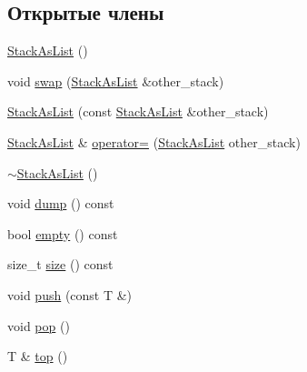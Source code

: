 \subsection*{Открытые члены}
\begin{DoxyCompactItemize}
\item 
\hyperlink{classstacks_1_1_stack_as_list_afeaf9531232f88bbfaea6fa27bfbfadb}{Stack\+As\+List} ()
\item 
void \hyperlink{classstacks_1_1_stack_as_list_ac60180f79b421783661b48e0aa3f5ed4}{swap} (\hyperlink{classstacks_1_1_stack_as_list}{Stack\+As\+List} \&other\+\_\+stack)
\item 
\hyperlink{classstacks_1_1_stack_as_list_a0506170dead8015e69e5216269f7d730}{Stack\+As\+List} (const \hyperlink{classstacks_1_1_stack_as_list}{Stack\+As\+List} \&other\+\_\+stack)
\item 
\hyperlink{classstacks_1_1_stack_as_list}{Stack\+As\+List} \& \hyperlink{classstacks_1_1_stack_as_list_ae7aad592f9620668c52ea8a68257bdd2}{operator=} (\hyperlink{classstacks_1_1_stack_as_list}{Stack\+As\+List} other\+\_\+stack)
\item 
\hyperlink{classstacks_1_1_stack_as_list_aa1bf1ce65b108c2888d95195bfc9d473}{$\sim$\+Stack\+As\+List} ()
\item 
void \hyperlink{classstacks_1_1_stack_as_list_aa1da18d566ab35554f4d3005d345ee5e}{dump} () const 
\item 
bool \hyperlink{classstacks_1_1_stack_as_list_a56147e51e4a0c2fef70e6d40a7a0b63d}{empty} () const 
\item 
size\+\_\+t \hyperlink{classstacks_1_1_stack_as_list_abd769ed3547312e16f9d8a1eff362cf0}{size} () const 
\item 
void \hyperlink{classstacks_1_1_stack_as_list_abb8422958e3e7605f040550ab4400ccb}{push} (const T \&)
\item 
void \hyperlink{classstacks_1_1_stack_as_list_a2f2b3319a9d76a9feb84b1855c84c55b}{pop} ()
\item 
T \& \hyperlink{classstacks_1_1_stack_as_list_a12cfaa9a9a137c07258aec159779cd1e}{top} ()
\end{DoxyCompactItemize}

